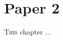\chapter{Paper 2}

\vspace*{-2.2em}
\minitoc
\vspace*{0.8em}

\lettrine[lines=3]{T}{his} chapter ...




